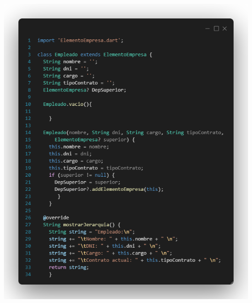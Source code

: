 \documentclass[
]{article}
\begin{document}
\includegraphics[width=5.90522in,height=7.125in]{imagenes/Empleado1.png}
\pagebreak
\end{document}
